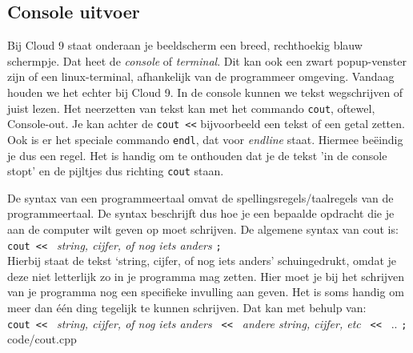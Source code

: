 \documentclass[12pt,a4paper]{article}
\newcommand{\code}{}
\newcommand{\icode}{\lstinline}
\begin{document}
\subsection{Console uitvoer}
Bij Cloud 9 staat onderaan je beeldscherm een breed, rechthoekig blauw schermpje. Dat heet de \emph{console} of \emph{terminal}. Dit kan ook een zwart popup-venster zijn of een linux-terminal, afhankelijk van de programmeer omgeving. Vandaag houden we het echter bij Cloud 9. In de console kunnen we tekst wegschrijven of juist lezen. Het neerzetten van tekst kan met het commando \icode{cout}, oftewel, Console-out. Je kan achter de \icode{cout <<} bijvoorbeeld een tekst of een getal zetten. Ook is er het speciale commando \icode{endl}, dat voor \emph{endline} staat. Hiermee be\"eindig je dus een regel. Het is handig om te onthouden dat je de tekst 'in de console stopt' en de pijltjes dus richting \icode{cout} staan.

De syntax van een programmeertaal omvat de spellingsregels/taalregels van de programmeertaal. De syntax beschrijft dus hoe je een bepaalde opdracht die je aan de computer wilt geven op moet schrijven. De algemene syntax van cout is:\\

\icode{cout << } \emph{string, cijfer, of nog iets anders} \icode{;}\\

Hierbij staat de tekst `string, cijfer, of nog iets anders' schuingedrukt, omdat je deze niet letterlijk zo in je programma mag zetten. Hier moet je bij het schrijven van je programma nog een specifieke invulling aan geven. Het is soms handig om meer dan \'e\'en ding tegelijk te kunnen schrijven. Dat kan met behulp van:\\

\icode{cout << } \emph{string, cijfer, of nog iets anders} \icode{ << } \emph{andere string, cijfer, etc} \icode{ << } .. \icode{;}\\

\code{code/cout.cpp}
\end{document}
